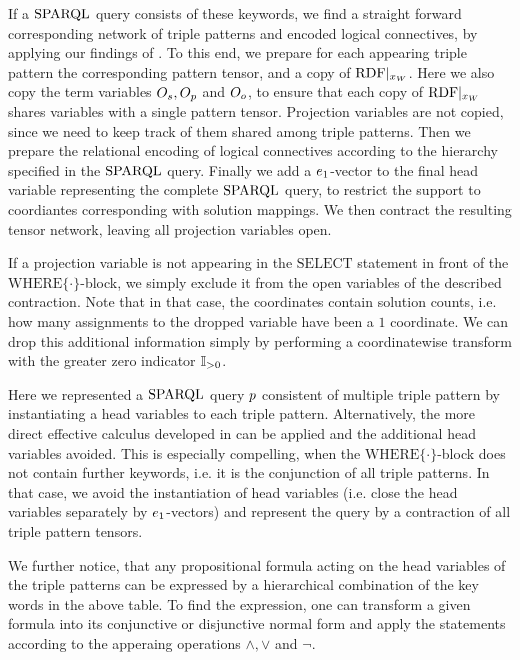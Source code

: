 If a $\mathrm{SPARQL}$ query consists of these keywords, we find a straight forward corresponding network of triple patterns and encoded logical connectives, by applying our findings of .
To this end, we prepare for each appearing triple pattern the corresponding pattern tensor, and a copy of ${\mathrm{RDF}}|_{x_{W}}$.
Here we also copy the term variables $O_{s},O_{p}$ and $O_{o}$, to ensure that each copy of ${\mathrm{RDF}}|_{x_{W}}$ shares variables with a single pattern tensor.
Projection variables are not copied, since we need to keep track of them shared among triple patterns.
Then we prepare the relational encoding of logical connectives according to the hierarchy specified in the $\mathrm{SPARQL}$ query.
Finally we add a $e_1$-vector to the final head variable representing the complete $\mathrm{SPARQL}$ query, to restrict the support to coordiantes corresponding with solution mappings.
We then contract the resulting tensor network, leaving all projection variables open.

If a projection variable is not appearing in the $\mathrm{SELECT}$ statement in front of the $\mathrm{WHERE}\{\cdot\}$-block, we simply exclude it from the open variables of the described contraction.
Note that in that case, the coordinates contain solution counts, i.e. how many assignments to the dropped variable have been a $1$ coordinate.
We can drop this additional information simply by performing a coordinatewise transform with the greater zero indicator $\mathbb{I}_{>0}$.

Here we represented a $\mathrm{SPARQL}$ query $p$ consistent of multiple triple pattern by instantiating a head variables to each triple pattern.
Alternatively, the more direct effective calculus developed in  can be applied and the additional head variables avoided.
This is especially compelling, when the $\mathrm{WHERE}\{\cdot\}$-block does not contain further keywords, i.e. it is the conjunction of all triple patterns.
In that case, we avoid the instantiation of head variables (i.e. close the head variables separately by $e_1$-vectors) and represent the query by a contraction of all triple pattern tensors.

We further notice, that any propositional formula acting on the head variables of the triple patterns can be expressed by a hierarchical combination of the key words in the above table.
To find the expression, one can transform a given formula into its conjunctive or disjunctive normal form and apply the statements according to the apperaing operations $\land,\lor$ and $\lnot$.


